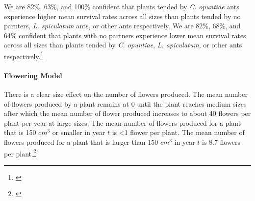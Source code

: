 \documentclass[11pt]{article}
\newcommand{\tom}[2]{{\color{red}{#1}}\footnote{\textit{\color{red}{#2}}}}
\begin{document}
We are 82\%, 63\%, and 100\% confident that plants tended by \textit{C. opuntiae} ants experience higher mean survival rates across all sizes than plants tended by no parnters, \textit{L. spiculatum} ants, or other ants respectively.
We are 82\%, 68\%, and 64\% confident that plants with no partners experience lower mean survival rates across all sizes than plants tended by \textit{C. opuntiae}, \textit{L. apiculatum}, or other ants respectively.\tom{}{Most of my comments from previous sections apply here, and it is uncear why you select specific contrasts to report statistical confidence but not others.}

\paragraph{Flowering Model}
There is a clear size effect on the number of flowers produced. 
The mean number of flowers produced by a plant remains at 0 until the plant reaches medium sizes after which the mean number of flower produced increases to about 40 flowers per plant per year at large sizes.
The mean number of flowers produced for a plant that is 150 $cm^3$ or smaller in year $t$ is <1 flower per plant.
The mean number of flowers produced for a plant that is larger than 150 $cm^3$ in year $t$ is 8.7 flowers per plant.\tom{}{If you are not showing these figures in the main text that you should provide them in an appendix, and reference them there. In fact, anywhere there is no role for ants I would move all those results to an appendix section. It is not clear to me whether you text here is referring to the prob flowering model, the number of flowerbuds model, or both.}


\end{document}
